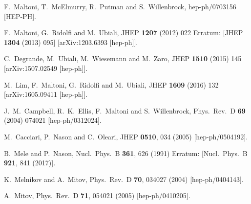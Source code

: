\documentclass[letter,11pt]{article}
\begin{document}
\begin{thebibliography}{99}
  F.~Maltoni, T.~McElmurry, R.~Putman and S.~Willenbrock,
  hep-ph/0703156 [HEP-PH].

  F.~Maltoni, G.~Ridolfi and M.~Ubiali,
  JHEP {\bf 1207} (2012) 022
   Erratum: [JHEP {\bf 1304} (2013) 095]
  [arXiv:1203.6393 [hep-ph]].
   
  C.~Degrande, M.~Ubiali, M.~Wiesemann and M.~Zaro,
  JHEP {\bf 1510} (2015) 145
  [arXiv:1507.02549 [hep-ph]].

  M.~Lim, F.~Maltoni, G.~Ridolfi and M.~Ubiali,
  JHEP {\bf 1609} (2016) 132
  [arXiv:1605.09411 [hep-ph]].

  J.~M.~Campbell, R.~K.~Ellis, F.~Maltoni and S.~Willenbrock,
  Phys.\ Rev.\ D {\bf 69} (2004) 074021
  [hep-ph/0312024].

  M.~Cacciari, P.~Nason and C.~Oleari,
  JHEP {\bf 0510}, 034 (2005)
  [hep-ph/0504192].

  B.~Mele and P.~Nason,
  Nucl.\ Phys.\ B {\bf 361}, 626 (1991)
  Erratum: [Nucl.\ Phys.\ B {\bf 921}, 841 (2017)].

  K.~Melnikov and A.~Mitov,
  Phys.\ Rev.\ D {\bf 70}, 034027 (2004)
  [hep-ph/0404143].
  
  A.~Mitov,
  Phys.\ Rev.\ D {\bf 71}, 054021 (2005)
  [hep-ph/0410205].


\end{thebibliography}
\end{document}
